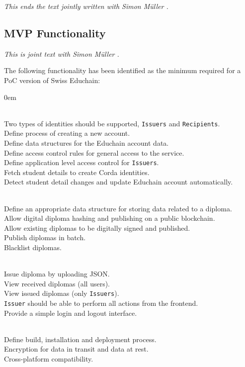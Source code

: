 \emph{This ends the text jointly written with Simon M{\"u}ller \cite{mueller20}.}

\subsection{MVP Functionality} \label{ssec:mvp-requirements}

\emph{This is joint text with Simon M{\"u}ller \cite{mueller20}.}

The following functionality has been identified as the minimum required for a PoC version of Swiss Educhain:

\begin{description}
	\itemsep0em
	\item [Identity management] \hfill \\
	Two types of identities should be supported, \texttt{Issuers} and \texttt{Recipients}. \hfill \\
	Define process of creating a new account. \hfill \\
	Define data structures for the Educhain account data. \hfill \\
	Define access control rules for general access to the service. \hfill \\
	Define application level access control for \texttt{Issuers}. \hfill \\
	Fetch student details to create Corda identities. \hfill \\
	Detect student detail changes and update Educhain account automatically. \hfill
	
	\item [Data Structures] \hfill \\
	Define an appropriate data structure for storing data related to a diploma. \hfill \\
	Allow digital diploma hashing and publishing on a public blockchain. \hfill \\
	Allow existing diplomas to be digitally signed and published. \hfill \\
	Publish diplomas in batch. \hfill \\
	Blacklist diplomas. \hfill 
	
	\item [Web Interface] \hfill \\
	Issue diploma by uploading JSON. \hfill \\
	View received diplomas (all users). \hfill \\
	View issued diplomas (only \texttt{Issuers}). \hfill \\
	\texttt{Issuer} should be able to perform all actions from the frontend. \hfill \\
	Provide a simple login and logout interface. \hfill 
	
	\item [Operations] \hfill \\
	Define build, installation and deployment process. \hfill \\
	Encryption for data in transit and data at rest. \hfill \\
	Cross-platform compatibility. \hfill 
\end{description}

